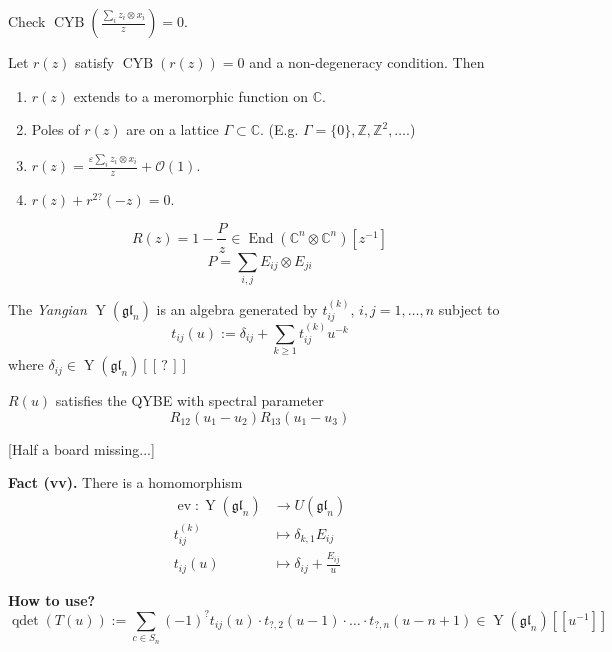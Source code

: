 \begin{exercise}
\label{exercise-l4-check}
Check
$\operatorname{CYB}\left(
\frac{\sum_{i}z_{i}\otimes x_{i}}{z}
\right) =0$.
\end{exercise}

\begin{theorem}
\label{theorem-l4-belavin-drinfeld}
Let $r(z)$ satisfy
$\operatorname{CYB}(r(z))=0$ and a
non-degeneracy condition. Then
\begin{enumerate}
\item $r(z)$ extends to a meromorphic
function on $\mathbb{C}$.
\item Poles of $r(z)$ are on a lattice
$\Gamma\subset \mathbb{C}$. (E.g.
$\Gamma=\{0\},\mathbb{Z},\mathbb{Z}^{2},
\ldots$.)
\item $r(z)=\frac{\varepsilon
\sum_{i}z_{i}\otimes x_{i}}{z}
+\mathcal{O}(1)$.
\item $r(z)+r^{2?}(-z)=0$.
\end{enumerate}
\end{theorem}

$$
R(z)=1-\frac{P}{z}\in
\operatorname{End}(\mathbb{C}^{n}\otimes
\mathbb{C}^{n})[z^{-1}]
$$
$$
P=\sum_{i,j}E_{ij}\otimes E_{ji}
$$

\begin{definition}
\label{definition-l4-yangian}
The {\it Yangian}
$\operatorname{Y}(\mathfrak{gl}_{n})$ is an
algebra generated by $t_{ij}^{(k)}$,
$i,j=1,\ldots,n$ subject to
$$
t_{ij}(u):=\delta_{ij}+\sum_{k\geq 1}
t^{(k)}_{ij}u^{-k}
$$
where $\delta_{ij}\in
\operatorname{Y}(\mathfrak{gl}_{n})[[\,?\,]]$
\end{definition}

\begin{proposition}
\label{proposition-l4-qybe}
$R(u)$ satisfies the QYBE with spectral
parameter
$$
R_{12}(u_{1}-u_{2})R_{13}(u_{1}-u_{3})
$$
\end{proposition}

[Half a board missing...]

\medskip\noindent
{\bf Fact (vv).}
There is a homomorphism
$$
\begin{aligned}
\operatorname{ev}:
\operatorname{Y}(\mathfrak{gl}_{n})
&\longrightarrow U(\mathfrak{gl}_{n}) \\
t_{ij}^{(k)} &\longmapsto
\delta_{k,1}E_{ij}\\
t_{ij}(u)&\longmapsto
\delta_{ij}+\frac{E_{ij}}{u}
\end{aligned}
$$

\medskip\noindent
{\bf How to use?}
$$
\operatorname{qdet}(T(u)):=
\sum_{c \in S_{n}}(-1)^{?}
t_{ij}(u)\cdot t_{?,2}(u-1)\cdot \ldots
\cdot t_{?,n}(u-n+1)\in
\operatorname{Y}(\mathfrak{gl}_{n})
[[u^{-1}]]
$$

